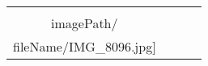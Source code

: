 \begin{table}
\begin{tabular}{cccc}
\texttt{[image: \\imagePath/\\fileName/IMG\_8096.jpg]} 
\end{tabular}
\end{table}
